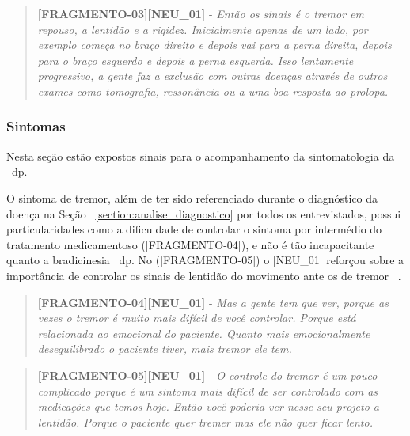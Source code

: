 \begin{quote}
\textbf{[FRAGMENTO-03][NEU\_01]} - 
\emph{
Então os sinais é o tremor em repouso, a lentidão e a rigidez. Inicialmente apenas de um lado, por exemplo começa no braço direito e depois vai para a perna direita, depois para o braço esquerdo e depois a perna esquerda. Isso lentamente progressivo, a gente faz a exclusão com outras doenças através de outros exames como tomografia, ressonância ou a uma boa resposta ao prolopa.
}
\end{quote}

\subsubsection{Sintomas}
Nesta seção estão expostos sinais para o acompanhamento da sintomatologia da ~\ac{dp}.

O sintoma de tremor, além de ter sido referenciado durante o diagnóstico da doença na Seção ~\ref{section:analise_diagnostico} por todos os entrevistados, possui particularidades como a dificuldade de controlar o sintoma por intermédio do tratamento medicamentoso ([FRAGMENTO-04]), e não é tão incapacitante quanto a bradicinesia ~\ac{dp}. No ([FRAGMENTO-05]) o [NEU\_01] reforçou sobre a importância de controlar os sinais de lentidão do movimento ante os de tremor ~\cite{do2007parkinson}.

\begin{quote}
\textbf{[FRAGMENTO-04][NEU\_01]} - 
\emph{
Mas a gente tem que ver, porque as vezes o tremor é muito mais difícil de você controlar. Porque está relacionada ao emocional do paciente. Quanto mais emocionalmente desequilibrado o paciente tiver, mais tremor ele tem.
}
\end{quote}

\begin{quote}
\textbf{[FRAGMENTO-05][NEU\_01]} - 
\emph{
O controle do tremor é um pouco complicado porque é um sintoma mais difícil de ser controlado com as medicações que temos hoje.  Então você poderia ver nesse seu projeto a lentidão. Porque o paciente quer tremer mas ele não quer ficar lento.
}
\end{quote}



